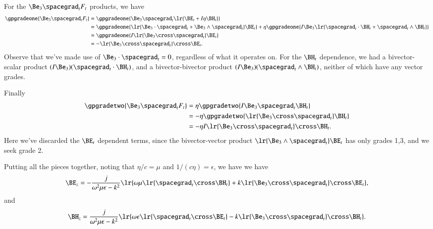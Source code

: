 {For the \( \Be_3 \spacegrad_t F_t \) products, we have
\begin{equation}\label{eqn:transverseFieldProblems:480}
\begin{aligned}
\gpgradeone{ \Be_3 \spacegrad_t F_t }
&=
\gpgradeone{ \Be_3 \spacegrad_t \lr{ \BE_t + I \eta \BH_t } } \\
&=
\gpgradeone{ \lr{ \Be_3 \cdot \spacegrad_t + \Be_3 \wedge \spacegrad_t } \BE_t }
+
\eta \gpgradeone{ I \Be_3 \lr{ \spacegrad_t \cdot \BH_t + \spacegrad_t \wedge \BH_t } } \\
&=
\gpgradeone{ I \lr{ \Be_3 \cross \spacegrad_t } \BE_t } \\
&=
-\lr{ \Be_3 \cross \spacegrad_t } \cross \BE_t.
\end{aligned}
\end{equation}
Observe that we've made use of \( \Be_3 \cdot \spacegrad_t = 0 \), regardless of what it operates on.  For the \( \BH_t \) dependence, we had a bivector-scalar product \( (I \Be_3) (\spacegrad_t \cdot \BH_t) \), and a bivector-bivector product \( (I \Be_3) (\spacegrad_t \wedge \BH_t) \), neither of which have any vector grades.

Finally
\begin{equation}\label{eqn:transverseFieldProblems:500}
\begin{aligned}
\gpgradetwo{ \Be_3 \spacegrad_t F_t }
&=
\eta \gpgradetwo{ I \Be_3 \spacegrad_t \BH_t } \\
&=
-\eta \gpgradetwo{ \lr{\Be_3 \cross \spacegrad_t} \BH_t } \\
&=
-\eta I \lr{\Be_3 \cross \spacegrad_t} \cross \BH_t.
\end{aligned}
\end{equation}
Here we've discarded the \( \BE_t \) dependent terms, since the bivector-vector product \( \lr{ \Be_3 \wedge \spacegrad_t } \BE_t \) has only grades 1,3, and we seek grade 2.

Putting all the pieces together, noting that \( \eta/c = \mu \) and \( 1/(c \eta) = \epsilon \), we have
we have
\begin{equation}\label{eqn:transverseFieldProblems:520}
\BE_z = -\frac{j}{\omega^2 \mu \epsilon - k^2 } \lr{ \omega \mu \lr{ \spacegrad_t \cross \BH_t } + k \lr{ \Be_3 \cross \spacegrad_t } \cross \BE_t },
\end{equation}
and
\begin{equation}\label{eqn:transverseFieldProblems:540}
\BH_z = \frac{j}{\omega^2 \mu \epsilon - k^2 } \lr{ \omega \epsilon \lr{ \spacegrad_t \cross \BE_t } - k \lr{\Be_3 \cross \spacegrad_t} \cross \BH_t }.
\end{equation}
} %
